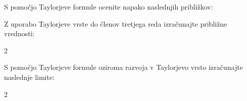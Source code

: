 \documentclass[11pt,a4paper]{exam}
\renewcommand{\{}{\lbrace}
\renewcommand{\}}{\rbrace}
\DeclareMathOperator{\arctg}{arctg}
\begin{document}
\begin{questions}

		\question S pomočjo Taylorjeve formule ocenite napako naslednjih približkov:

			\question Z uporabo Taylorjeve vrste do členov tretjega reda izračunajte približne vrednosti:
			\begin{multicols}{2}
			\end{multicols}

\question S pomočjo Taylorjeve formule oziroma razvoja v Taylorjevo vrsto izračunajte naslednje limite:
\begin{multicols}{2}
\end{multicols}
\end{questions}
\end{document}
